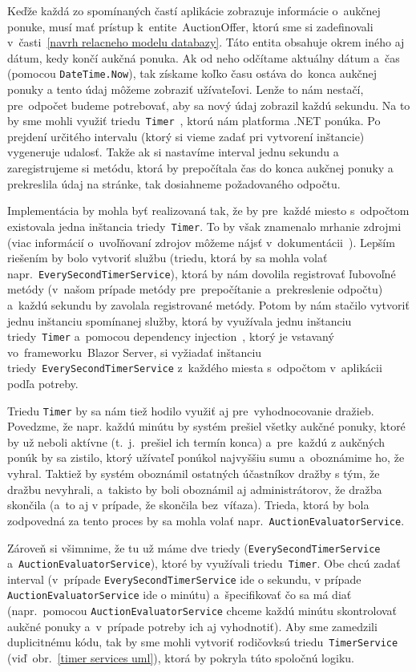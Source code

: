 Keďže každá zo spomínaných častí aplikácie zobrazuje informácie o~aukčnej ponuke, musí mať prístup k~entite~AuctionOffer, ktorú sme si zadefinovali v~časti~\ref{navrh relacneho modelu databazy}. Táto entita obsahuje okrem iného aj dátum, kedy končí aukčná ponuka. Ak od neho odčítame aktuálny dátum a~čas (pomocou \verb|DateTime.Now|), tak získame koľko času ostáva do~konca aukčnej ponuky a tento údaj môžeme zobraziť užívateľovi. Lenže to nám nestačí, pre~odpočet budeme potrebovať, aby sa nový údaj zobrazil každú sekundu. Na to by sme mohli využiť triedu~\texttt{Timer}~\cite{timer}, ktorú nám platforma .NET ponúka. Po prejdení určitého intervalu (ktorý si vieme zadať pri vytvorení inštancie) vygeneruje udalosť. Takže ak si nastavíme interval jednu sekundu a zaregistrujeme si metódu, ktorá by prepočítala čas do konca aukčnej ponuky a prekreslila údaj na stránke, tak dosiahneme požadovaného odpočtu.

Implementácia by mohla byť realizovaná tak, že by pre~každé miesto s~odpočtom existovala jedna inštancia triedy~\verb|Timer|. To by však znamenalo mrhanie zdrojmi (viac informácií o~uvoľňovaní zdrojov môžeme nájsť v~dokumentácii~\cite{dispose}). Lepším riešením by bolo vytvoriť službu (triedu, ktorá by sa mohla volať napr.~\verb|EverySecondTimerService|), ktorá by nám dovolila registrovať ľubovoľné metódy (v~našom prípade metódy pre~prepočítanie a~prekreslenie odpočtu) a~každú sekundu by zavolala registrované metódy. Potom by nám stačilo vytvoriť jednu inštanciu spomínanej služby, ktorá by využívala jednu inštanciu triedy~\verb|Timer| a~pomocou dependency injection~\cite{dependency injection}, ktorý je vstavaný vo~frameworku~Blazor Server, si vyžiadať inštanciu triedy~\verb|EverySecondTimerService| z~každého miesta s~odpočtom v~aplikácii podľa potreby.

Triedu \verb|Timer| by sa nám tiež hodilo využiť aj pre~vyhodnocovanie dražieb. Povedzme, že napr. každú minútu by systém prešiel všetky aukčné ponuky, ktoré by už neboli aktívne (t.~j.~prešiel ich termín konca) a~pre~každú z aukčných ponúk by sa zistilo, ktorý užívateľ ponúkol najvyššiu sumu a~oboznámime ho, že vyhral. Taktiež by systém oboznámil ostatných účastníkov dražby s tým, že dražbu nevyhrali, a~takisto by boli oboznámil aj administrátorov, že dražba skončila (a~to aj v prípade, že skončila bez~víťaza). Trieda, ktorá by bola zodpovedná za tento proces by sa mohla volať napr.~\verb|AuctionEvaluatorService|.

Zároveň si všimnime, že tu už máme dve triedy (\verb|EverySecondTimerService| a~\verb|AuctionEvaluatorService|), ktoré by využívali triedu~\verb|Timer|. Obe chcú zadať interval (v~prípade \verb|EverySecondTimerService| ide o sekundu, v prípade \verb|AuctionEvaluatorService| ide o minútu) a~špecifikovať čo sa má diať (napr.~pomocou \verb|AuctionEvaluatorService| chceme každú minútu skontrolovať aukčné ponuky a~v~prípade potreby ich aj vyhodnotiť). Aby sme zamedzili duplicitnému kódu, tak by sme mohli vytvoriť rodičovksú triedu~\verb|TimerService| (viď~obr.~\ref{timer services uml}), ktorá by pokryla túto spoločnú logiku.

